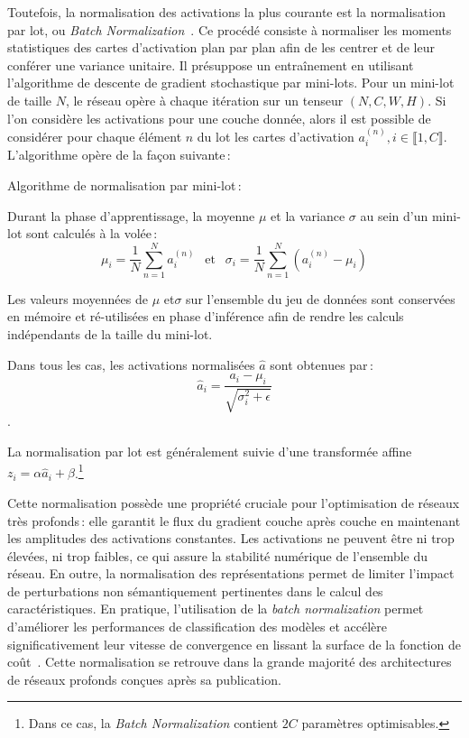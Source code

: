 Toutefois, la normalisation des activations la plus courante est la normalisation par lot, ou \emph{Batch Normalization}~\cite{ioffe_batch_2015}. Ce procédé consiste à normaliser les moments statistiques des cartes d'activation plan par plan afin de les centrer et de leur conférer une variance unitaire. Il présuppose un entraînement en utilisant l'algorithme de descente de gradient stochastique par mini-lots. Pour un mini-lot de taille $N$, le réseau opère à chaque itération sur un tenseur $(N, C, W, H)$. Si l'on considère les activations pour une couche donnée, alors il est possible de considérer pour chaque élément $n$ du lot les cartes d'activation $a^{(n)}_i, i \in \llbracket 1,C \rrbracket$. L'algorithme opère de la façon suivante\,:
\begin{definition}
Algorithme de normalisation par mini-lot\,:

Durant la phase d'apprentissage, la moyenne $\mu$ et la variance $\sigma$ au sein d'un mini-lot sont calculés à la volée\,:
$$\mu_i = \frac{1}{N} \sum_{n=1}^N a_i^{(n)}~~\text{ et }~~\sigma_i = \frac{1}{N} \sum_{n=1}^N (a_i^{(n)} - \mu_i)$$

Les valeurs moyennées de $\mu$ et$\sigma$ sur l'ensemble du jeu de données sont conservées en mémoire et ré-utilisées en phase d'inférence afin de rendre les calculs indépendants de la taille du mini-lot.

Dans tous les cas, les activations normalisées $\hat{a}$ sont obtenues par\,:
$$\hat{a}_i = \frac{a_i - \mu_i}{\sqrt{\sigma_i^2 + \epsilon}}$$.
\end{definition}

La normalisation par lot est généralement suivie d'une transformée affine $z_i = \alpha \hat{a}_i + \beta$.\footnote{Dans ce cas, la \emph{Batch Normalization} contient $2C$ paramètres optimisables.}

Cette normalisation possède une propriété cruciale pour l'optimisation de réseaux très profonds\,: elle garantit le flux du gradient couche après couche en maintenant les amplitudes des activations constantes. Les activations ne peuvent être ni trop élevées, ni trop faibles, ce qui assure la stabilité numérique de l'ensemble du réseau. En outre, la normalisation des représentations permet de limiter l'impact de perturbations non sémantiquement pertinentes dans le calcul des caractéristiques. En pratique, l'utilisation de la \emph{batch normalization} permet d'améliorer les performances de classification des modèles et accélère significativement leur vitesse de convergence en lissant la surface de la fonction de coût~\cite{santurkar_how_2018}. Cette normalisation se retrouve dans la grande majorité des architectures de réseaux profonds conçues après sa publication.

